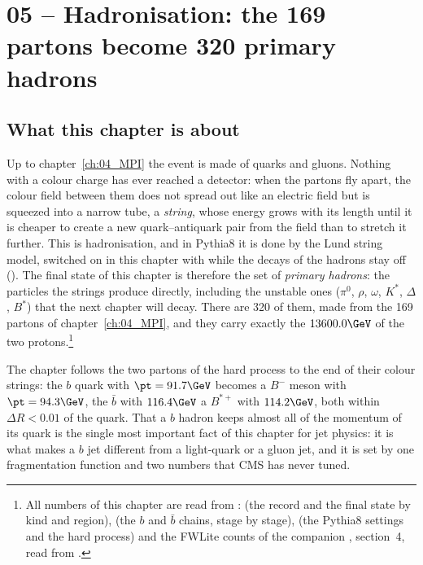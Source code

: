 \chapter{05 -- Hadronisation: the 169 partons become 320 primary hadrons}
\label{ch:05_Had}

\section{What this chapter is about}
Up to chapter~\ref{ch:04_MPI} the event is made of quarks and gluons. Nothing with a colour charge has ever
reached a detector: when the partons fly apart, the colour field between them does not spread out like an
electric field but is squeezed into a narrow tube, a \emph{string}, whose energy grows with its length until it
is cheaper to create a new quark--antiquark pair from the field than to stretch it further. This is
hadronisation, and in Pythia8 it is done by the Lund string model, switched on in this chapter with
 while the decays of the hadrons stay off ().
The final state of this chapter is therefore the set of \emph{primary hadrons}: the particles the strings
produce directly, including the unstable ones ($\pi^0$, $\rho$, $\omega$, $K^*$, $\Delta$, $B^*$) that the next
chapter will decay. There are 320 of them, made from the 169 partons of chapter~\ref{ch:04_MPI}, and they carry
exactly the $13600.0\GeV$ of the two protons.\footnote{All numbers of this chapter are read from
:  (the record and the final state by kind and region),
 (the $b$ and $\bar b$ chains, stage by stage), 
(the Pythia8 settings and the hard process) and the FWLite counts of the companion
, section~4, read from .}

The chapter follows the two partons of the hard process to the end of their colour strings: the $b$ quark
with $\pt=91.7\GeV$ becomes a $B^-$ meson with $\pt=94.3\GeV$, the $\bar b$ with $116.4\GeV$ a $B^{*+}$ with
$114.2\GeV$, both within $\Delta R<0.01$ of the quark. That a $b$ hadron keeps almost all of the momentum of
its quark is the single most important fact of this chapter for jet physics: it is what makes a $b$ jet
different from a light-quark or a gluon jet, and it is set by one fragmentation function and two numbers
that CMS has never tuned.

